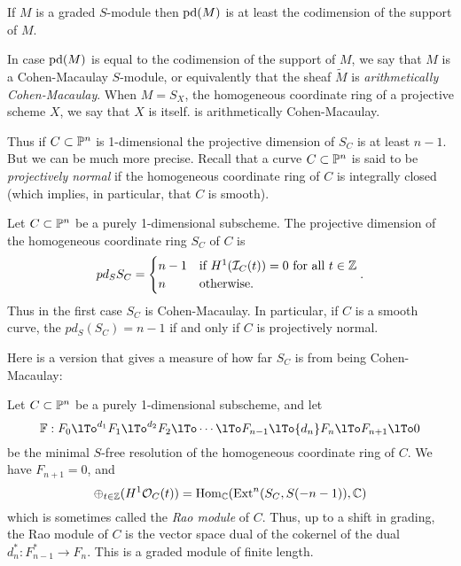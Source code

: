 \begin{proposition}
If $M$ is a graded $S$-module then $\pd(M)$ is at least the codimension of the support of $M$.
\end{proposition}

In case $\pd(M)$ is equal to the codimension of the support of $M$, we say that $M$ is a
Cohen-Macaulay $S$-module, or equivalently that the sheaf $\widetilde M$ is 
\emph{arithmetically Cohen-Macaulay}. When $M = S_{X}$, the homogeneous coordinate ring of a projective scheme $X$, we say that $X$ is itself. is arithmetically Cohen-Macaulay.

Thus if $C\subset \PP^{n}$ is 1-dimensional the projective dimension of $S_{C}$ is at least $n-1$. But we can be much more precise. Recall that a curve $C\subset \PP^{n}$ is said to be \emph{projectively normal} if the homogeneous coordinate ring of $C$ is integrally closed (which implies, in particular, that $C$ is smooth).

\begin{theorem}
 Let $C\subset \PP^{n}$ be a purely 1-dimensional subscheme. The projective dimension of the homogeneous coordinate ring $S_{C}$ of $C$  is
$$
 pd_{S}S_{C} = 
\begin{cases}
n-1 &\hbox{if $H^{1}(\sI_{C}(t)) = 0$ for all $t\in \ZZ$}\\
n &\hbox{otherwise}.
\end{cases}.
$$
Thus in the first case $S_{C}$ is Cohen-Macaulay. In particular, if $C$ is a smooth curve, the $pd_{S}(S_{C}) = n-1$ if and only if $C$ is projectively normal. 
\end{theorem}

Here is a version that gives a measure of how far $S_C$ is  from being Cohen-Macaulay:

\begin{theorem}
Let $C\subset \PP^{n}$ be a purely 1-dimensional subscheme, and let  
$$
\FF: F_{0}\lTo^{d_{1}} F_{1}\lTo^{d_{2}} F_{2}\lTo \cdots \lTo F_{n-1}\lTo {d_{n}}F_{n}\lTo F_{n+1} \lTo 0
$$
be the minimal $S$-free resolution of the homogeneous coordinate ring of $C$. We have $F_{n+1}=0$, and 
$$
\oplus_{t\in \ZZ} (H^{1}\sO_{C}(t)) = \Hom_{\CC}(\Ext^{n}(S_{C}, S(-n-1)),\CC)
$$ 
which is sometimes called the \emph{Rao module} of $C$. Thus, up to a shift in grading,
the Rao module of $C$ is the vector space dual of the cokernel of the dual $d_{n}^{*}: F_{n-1}^{*}\to F_{n}$. This is a graded module of finite length.
\end{theorem}


